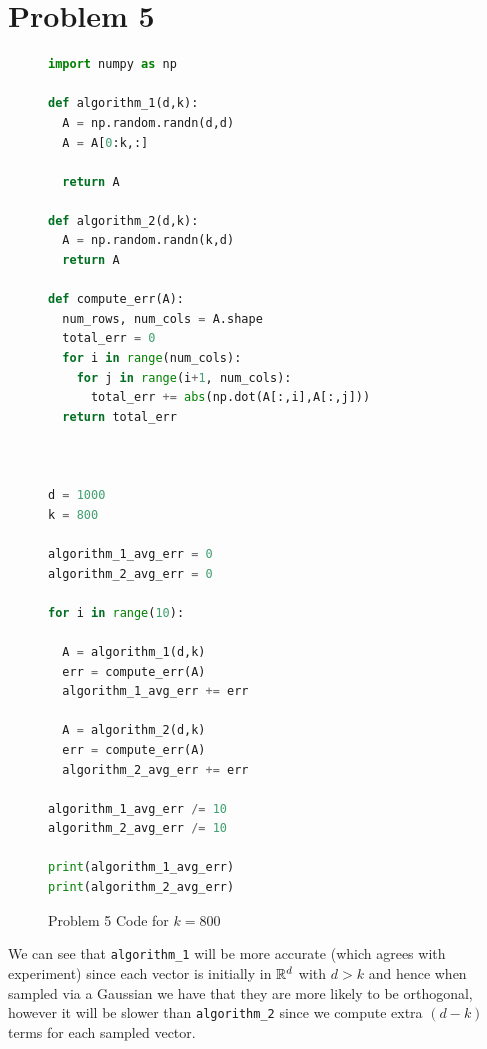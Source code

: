 \documentclass[12pt]{report}
\begin{document}
\section*{Problem 5}
\begin{figure}[H]
    \centering
\begin{lstlisting}[language=python]
import numpy as np

def algorithm_1(d,k):
  A = np.random.randn(d,d)
  A = A[0:k,:]

  return A

def algorithm_2(d,k):
  A = np.random.randn(k,d)
  return A

def compute_err(A):
  num_rows, num_cols = A.shape
  total_err = 0
  for i in range(num_cols):
    for j in range(i+1, num_cols):
      total_err += abs(np.dot(A[:,i],A[:,j]))
  return total_err



d = 1000
k = 800

algorithm_1_avg_err = 0
algorithm_2_avg_err = 0

for i in range(10):

  A = algorithm_1(d,k)
  err = compute_err(A)
  algorithm_1_avg_err += err

  A = algorithm_2(d,k)
  err = compute_err(A)
  algorithm_2_avg_err += err

algorithm_1_avg_err /= 10
algorithm_2_avg_err /= 10

print(algorithm_1_avg_err)
print(algorithm_2_avg_err)
\end{lstlisting}
\caption{Problem 5 Code for $k = 800$}
    \label{fig:enter-label}
\end{figure}
We can see that \texttt{algorithm\_1} will be more accurate (which agrees with experiment) since each vector is initially in $\mathbb{R}^d$ with $d > k$ and hence when sampled via a Gaussian we have that they are more likely to be orthogonal, however it will be slower than \texttt{algorithm\_2} since we compute extra $(d-k)$ terms for each sampled vector.
\end{document}
